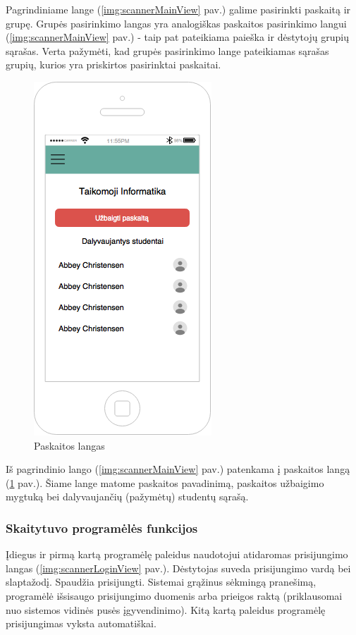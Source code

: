 \documentclass{VUMIFPSkursinis}
\begin{document}
Pagrindiniame lange (\ref{img:scannerMainView} pav.) galime pasirinkti paskaitą ir grupę. Grupės pasirinkimo langas yra analogiškas paskaitos pasirinkimo langui (\ref{img:scannerMainView} pav.) - taip pat pateikiama paieška ir dėstytojų grupių sąrašas. Verta pažymėti, kad grupės pasirinkimo lange pateikiamas sąrašas grupių, kurios yra priskirtos pasirinktai paskaitai.

\begin{figure}[H]
	\centering
	\includegraphics[scale=0.5]{img/kursinio_app_dest_lecture}
	\caption{Paskaitos langas}
	\label{img:scannerLectureView}
\end{figure}

Iš pagrindinio lango (\ref{img:scannerMainView} pav.) patenkama į paskaitos langą (\ref{img:scannerLectureView} pav.). Šiame lange matome paskaitos pavadinimą, paskaitos užbaigimo mygtuką bei dalyvaujančių (pažymėtų) studentų sąrašą.

\subsubsection{Skaitytuvo programėlės funkcijos}


Įdiegus ir pirmą kartą programėlę paleidus naudotojui atidaromas prisijungimo langas (\ref{img:scannerLoginView} pav.). Dėstytojas suveda prisijungimo vardą bei slaptažodį. Spaudžia prisijungti. Sistemai grąžinus sėkmingą pranešimą, programėlė išsisaugo prisijungimo duomenis arba prieigos raktą (priklausomai nuo sistemos vidinės pusės įgyvendinimo). Kitą kartą paleidus programėlę prisijungimas vyksta automatiškai.
\end{document}

